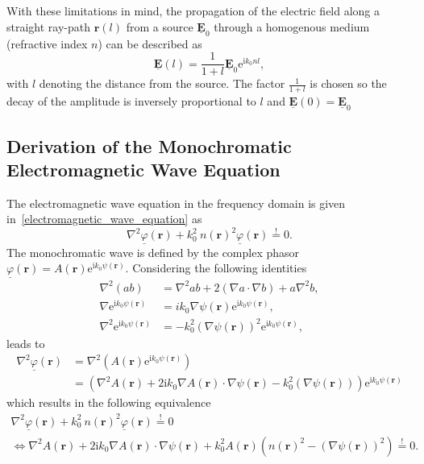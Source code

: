 With these limitations in mind, the propagation of the electric field along a straight ray-path \(\bm{r}(l)\) from a source \(\underline{\bm{E}}_0\) through a homogenous medium (refractive index \(n\)) can be described as
\begin{equation} \label{eq:field-along-ray-path}
    \underline{\bm{E}}(l) = \frac{1}{1 + l} \underline{\bm{E}}_0 \mathrm{e}^{\mathrm{i} k_0 n l},
\end{equation}
with \(l\) denoting the distance from the source.
The factor \(\frac{1}{1 + l}\) is chosen so the decay of the amplitude is inversely proportional to \(l\) and  \(\underline{\bm{E}}(0) = \underline{\bm{E}}_0 \)




\subsection{Derivation of the Monochromatic Electromagnetic Wave Equation}\label{derivation}
The electromagnetic wave equation in the frequency domain is given in~\eqref{electromagnetic_wave_equation} as
\begin{equation}
    \nabla^2 \underline{\varphi}(\bm{r}) + k_0^2\ n{(\bm{r})}^2 \underline{\varphi}(\bm{r}) \stackrel{!}{=} 0.
\end{equation}
The monochromatic wave is defined by the complex phasor \(\underline{\varphi}(\bm{r}) = A(\bm{r}) \mathrm{e}^{\mathrm{i}k_0 \psi(\bm{r})}\).
Considering the following identities
\begin{align}
    \nabla^2 (a b) &= \nabla^2 a b + 2 (\nabla a \cdot \nabla b) + a \nabla^2 b, \\
    \nabla \mathrm{e}^{\mathrm{i} k_0 \psi(\bm{r})} &= i k_0 \nabla \psi(\bm{r}) \mathrm{e}^{\mathrm{i} k_0 \psi(\bm{r})}, \\
    \nabla^2 \mathrm{e}^{\mathrm{i} k_0 \psi(\bm{r})} &= - k_0^2 {(\nabla \psi(\bm{r}))}^2 \mathrm{e}^{\mathrm{i} k_0 \psi(\bm{r})},
\end{align}
leads to
\begin{align}
    \nabla^2 \underline{\varphi}(\bm{r}) &=\nabla^2 (A(\bm{r}) \mathrm{e}^{\mathrm{i}k_0 \psi(\bm{r})}) \nonumber \\
                                        &= (\nabla^2 A(\bm{r}) + 2\mathrm{i}k_0 \nabla A(\bm{r}) \cdot \nabla \psi(\bm{r}) - k_0^2 (\nabla \psi(\bm{r}))) \mathrm{e}^{\mathrm{i}k_0 \psi(\bm{r})}
\end{align}
which results in the following equivalence
\begin{gather}
    \nabla^2 \underline{\varphi}(\bm{r}) + k_0^2\ n{(\bm{r})}^2 \underline{\varphi}(\bm{r}) \stackrel{!}{=} 0 \\
    \Leftrightarrow \nabla^2 A(\bm{r}) + 2\mathrm{i}k_0 \nabla A(\bm{r}) \cdot \nabla \psi(\bm{r}) + k_0^2 A(\bm{r}) ({n(\bm{r})}^2 - {(\nabla \psi(\bm{r}))}^2) \stackrel{!}{=} 0.
\end{gather}